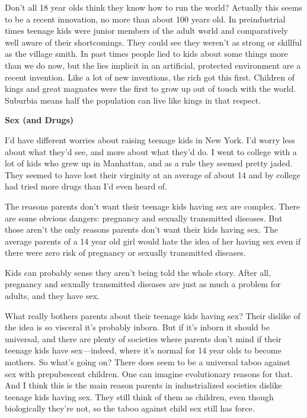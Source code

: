 Don't all
                  18 year olds think they know how to run the world? Actually
                  this seems to be a recent innovation, no more than about 100
                  years old. In preindustrial times teenage kids were junior
                  members of the adult world and comparatively well aware of
                  their shortcomings. They could see they weren't as strong or
                  skillful as the village smith. In past times people lied to
                  kids about some things more than we do now, but the lies
                  implicit in an artificial, protected environment are a recent
                  invention. Like a lot of new inventions, the rich got this
                  first. Children of kings and great magnates were the first to
                  grow up out of touch with the world. Suburbia means half the
                  population can live like kings in that respect.


                  \textbf{Sex (and Drugs)}

I'd have different worries
                  about raising teenage kids in New York. I'd worry less about
                  what they'd see, and more about what they'd do. I went to
                  college with a lot of kids who grew up in Manhattan, and as a
                  rule they seemed pretty jaded. They seemed to have lost their
                  virginity at an average of about 14 and by college had tried
                  more drugs than I'd even heard of.

The reasons
                  parents don't want their teenage kids having sex are complex.
                  There are some obvious dangers: pregnancy and sexually
                  transmitted diseases. But those aren't the only reasons
                  parents don't want their kids having sex. The average parents
                  of a 14 year old girl would hate the idea of her having sex
                  even if there were zero risk of pregnancy or sexually
                  transmitted diseases.

Kids can probably sense they
                  aren't being told the whole story. After all, pregnancy and
                  sexually transmitted diseases are just as much a problem for
                  adults, and they have sex.

What really bothers
                  parents about their teenage kids having sex? Their dislike of
                  the idea is so visceral it's probably inborn. But if it's
                  inborn it should be universal, and there are plenty of
                  societies where parents don't mind if their teenage kids have
                  sex---indeed, where it's normal for 14 year olds to become
                  mothers. So what's going on? There does seem to be a universal
                  taboo against sex with prepubescent children. One can imagine
                  evolutionary reasons for that. And I think this is the main
                  reason parents in industrialized societies dislike teenage
                  kids having sex. They still think of them as children, even
                  though biologically they're not, so the taboo against child
                  sex still has force.

